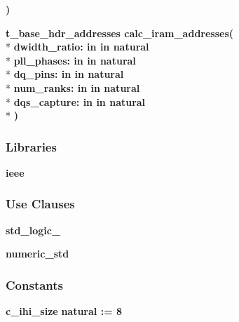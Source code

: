 \begin{DoxyCompactItemize}
{\bfseries  )} 
\item 
{\bfseries {\bfseries {\bfseries {\bf t\+\_\+base\+\_\+hdr\+\_\+addresses}} \textcolor{vhdlchar}{ }}} {\bf calc\+\_\+iram\+\_\+addresses}{\bfseries  ( }\\*
{\bfseries \textcolor{vhdlchar}{dwidth\+\_\+ratio\+: }\textcolor{stringliteral}{in }\textcolor{vhdlchar}{in natural}}\\*
{\bfseries \textcolor{vhdlchar}{pll\+\_\+phases\+: }\textcolor{stringliteral}{in }\textcolor{vhdlchar}{in natural}}\\*
{\bfseries \textcolor{vhdlchar}{dq\+\_\+pins\+: }\textcolor{stringliteral}{in }\textcolor{vhdlchar}{in natural}}\\*
{\bfseries \textcolor{vhdlchar}{num\+\_\+ranks\+: }\textcolor{stringliteral}{in }\textcolor{vhdlchar}{in natural}}\\*
{\bfseries \textcolor{vhdlchar}{dqs\+\_\+capture\+: }\textcolor{stringliteral}{in }\textcolor{vhdlchar}{in natural}}\\*
{\bfseries  )} 
\end{DoxyCompactItemize}
\subsubsection*{Libraries}
 \begin{DoxyCompactItemize}
\item 
{\bf ieee} 
\end{DoxyCompactItemize}
\subsubsection*{Use Clauses}
 \begin{DoxyCompactItemize}
\item 
{\bf std\+\_\+logic\+\_}   
\item 
{\bf numeric\+\_\+std}   
\end{DoxyCompactItemize}
\subsubsection*{Constants}
 \begin{DoxyCompactItemize}
\item 
{\bf c\+\_\+ihi\+\_\+size} {\bfseries \textcolor{comment}{natural}\textcolor{vhdlchar}{ }\textcolor{vhdlchar}{ }\textcolor{vhdlchar}{\+:}\textcolor{vhdlchar}{=}\textcolor{vhdlchar}{ }\textcolor{vhdlchar}{ } \textcolor{vhdldigit}{8} \textcolor{vhdlchar}{ }} 
\end{DoxyCompactItemize}
